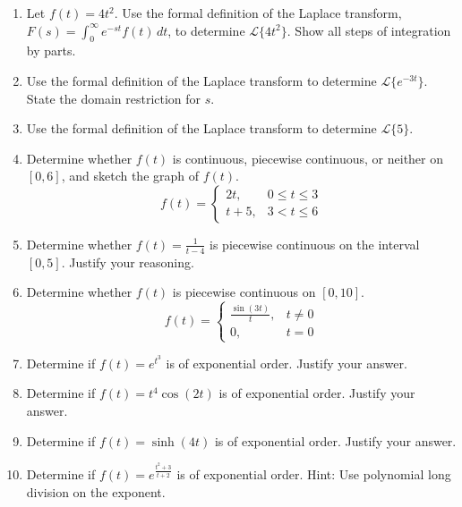 \documentclass[11pt, letterpaper]{article}
\theoremstyle{definition}
\theoremstyle{remark}
\begin{document}
\begin{enumerate}[label=\textbf{Problem \arabic*.}, leftmargin=*]

    \item Let $f(t) = 4t^2$. Use the formal definition of the Laplace transform, $F(s) = \int_0^\infty e^{-st}f(t)\,dt$, to determine $\mathscr{L}\{4t^2\}$. Show all steps of integration by parts.
    
    \item Use the formal definition of the Laplace transform to determine $\mathscr{L}\{e^{-3t}\}$. State the domain restriction for $s$.
    
    \item Use the formal definition of the Laplace transform to determine $\mathscr{L}\{5\}$.
    
    \item Determine whether $f(t)$ is continuous, piecewise continuous, or neither on $[0, 6]$, and sketch the graph of $f(t)$.
    \[
    f(t) = 
    \begin{cases} 
    2t, & 0 \le t \le 3 \\ 
    t + 5, & 3 < t \le 6 
    \end{cases}
    \]
    
    \item Determine whether $f(t) = \frac{1}{t-4}$ is piecewise continuous on the interval $[0, 5]$. Justify your reasoning.
    
    \item Determine whether $f(t)$ is piecewise continuous on $[0, 10]$.
    \[
    f(t) = 
    \begin{cases} 
    \frac{\sin(3t)}{t}, & t \neq 0 \\ 
    0, & t = 0 
    \end{cases}
    \]
    
    \item Determine if $f(t) = e^{t^3}$ is of exponential order. Justify your answer.
    
    \item Determine if $f(t) = t^4 \cos(2t)$ is of exponential order. Justify your answer.
    
    \item Determine if $f(t) = \sinh(4t)$ is of exponential order. Justify your answer.
    
    \item Determine if $f(t) = e^{\frac{t^2+3}{t+2}}$ is of exponential order. Hint: Use polynomial long division on the exponent.
    

\end{enumerate}
\end{document}
